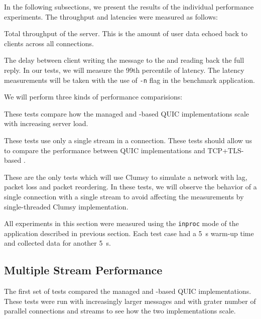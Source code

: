 In the following subsections, we present the results of the individual performance experiments. The
throughput and latencies were measured as follows:

\begin{itemize}

   Total throughput of the server. This is the amount of user data echoed back to
clients across all connections.

   The delay between client writing the message to the \Stream{} and reading back the
full reply. In our tests, we will measure the 99th percentile of latency. The latency measurements
will be taken with the use of \texttt{-n} flag in the benchmark application.

\end{itemize}

We will perform three kinds of performance comparisions:

\begin{itemize}

   These tests compare how the managed and \libmsquic{}-based
QUIC implementations scale with increasing server load.

   These tests use only a single stream in a connection. These
tests should allow us to compare the performance between QUIC implementations and TCP+TLS-based
\SslStream{}.

   These are the only tests which will use Clumsy
to simulate a network with lag, packet loss and packet reordering. In these tests, we will observe
the behavior of a single connection with a single stream to avoid affecting the measurements by
single-threaded Clumsy implementation.

\end{itemize}

All experiments in this section were measured using the \texttt{inproc} mode of the application
described in previous section. Each test case had a \SI{5}{\second} warm-up time and collected
data for another \SI{5}{\second}.

\subsection{Multiple Stream Performance}\label{sec:04-multi-stream-perf}

The first set of tests compared the managed and \libmsquic{}-based QUIC implementations. These tests
were run with increasingly larger messages and with grater number of parallel connections and
streams to see how the two implementations scale.

